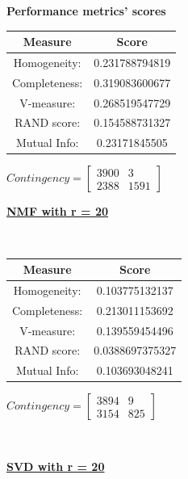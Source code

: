 \documentclass{report}
\begin{document}
\begin{center}
	\textbf{Performance metrics' scores} \\ \vspace{10pt}	
	\begin{tabular}{*{2}{c}}
		\toprule
		\textbf{Measure} & \textbf{Score} \\
		\midrule
		Homogeneity: & 0.231788794819 \\
		\midrule
		Completeness: & 0.319083600677 \\
		\midrule
		V-measure: 	& 0.268519547729 \\
		\midrule
		RAND score: & 0.154588731327 \\
		\midrule
		Mutual Info: & 0.23171845505 \\
		\bottomrule
	\end{tabular}
	\qquad
	$Contingency = \left[ \begin{array}{*{2}{c}}
		3900 & 3 \\
		2388 & 1591
		\end{array}\right]
		$
\end{center}
\newpage


\underline{\textbf{NMF with r = 20}} 

\begin{center}
	\textbf{} \\ \vspace{10pt}
	\begin{tabular}{*{2}{c}} 
		\toprule
		\textbf{Measure} & \textbf{Score} \\	
		\midrule
		Homogeneity: & 0.103775132137 \\
		\midrule
		Completeness: & 0.213011153692 \\
		\midrule
		V-measure: 	& 0.139559454496 \\
		\midrule
		RAND score: & 0.0388697375327 \\
		\midrule
		Mutual Info: & 0.103693048241 \\
		\bottomrule
	\end{tabular}
	\qquad	
	$Contingency = \left[\begin{array}{*{2}{c}}
		3894  & 9 \\
		3154  & 825 
		\end{array}\right]
	$
\end{center}

\\ \vspace{20pt}

\underline{\textbf{SVD with r = 20}} 
\end{document}
